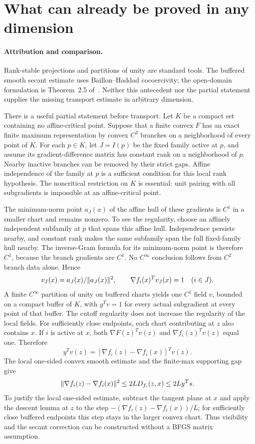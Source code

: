 \setcounter{section}{8}
\setcounter{theorem}{7}
\setcounter{equation}{17}
\section{What can already be proved in any dimension}
\paragraph{Attribution and comparison.}
Rank-stable projections and partitions of unity are standard tools. The buffered smooth secant estimate uses Baillon--Haddad cocoercivity; the open-domain formulation is Theorem~2.5 of~\cite{WW}. Neither this antecedent nor the partial statement supplies the missing transport estimate in arbitrary dimension.

There is a useful partial statement before transport. Let $K$ be a compact set containing no affine-critical point. Suppose that a finite convex $F$ has an exact finite maximum representation by convex $C^2$ branches on a neighborhood of every point of $K$. For each $p\in K$, let $J=I(p)$ be the fixed family active at $p$, and assume its gradient-difference matrix has constant rank on a neighborhood of $p$. Nearby inactive branches can be removed by their strict gaps. Affine independence of the family at $p$ is a sufficient condition for this local rank hypothesis. The noncritical restriction on $K$ is essential: unit pairing with all subgradients is impossible at an affine-critical point.

The minimum-norm point $a_J(x)$ of the affine hull of these gradients is $C^1$ in a smaller chart and remains nonzero. To see the regularity, choose an affinely independent subfamily at $p$ that spans this affine hull. Independence persists nearby, and constant rank makes the same subfamily span the full fixed-family hull nearby. The inverse-Gram formula for its minimum-norm point is therefore $C^1$, because the branch gradients are $C^1$. No $C^\infty$ conclusion follows from $C^2$ branch data alone. Hence
\[
 v_J(x)=a_J(x)/\lVert a_J(x)\rVert^2,
 \qquad \nabla f_i(x)^Tv_J(x)=1\quad(i\in J).
\]
A finite $C^\infty$ partition of unity on buffered charts yields one $C^1$ field $v$, bounded on a compact buffer of $K$, with $g^Tv=1$ for every actual subgradient at every point of that buffer. The cutoff regularity does not increase the regularity of the local fields. For sufficiently close endpoints, each chart contributing at $z$ also contains $x$. If $i$ is active at $x$, both $\nabla F(z)^Tv(z)$ and $\nabla f_i(z)^Tv(z)$ equal one. Therefore
\[
 y^Tv(z)=[\nabla f_i(z)-\nabla f_i(x)]^Tv(z).
\]
The local one-sided convex smooth estimate and the finite-max supporting gap give
\[
 \lVert \nabla f_i(z)-\nabla f_i(x)\rVert^2
 \le2L D_{f_i}(z,x)\le2L y^Ts.
\]
To justify the local one-sided estimate, subtract the tangent plane at $x$ and apply the descent lemma at $z$ to the step $-(\nabla f_i(z)-\nabla f_i(x))/L$; for sufficiently close buffered endpoints this step stays in the larger convex chart. Thus visibility and the secant correction can be constructed without a BFGS matrix assumption.


